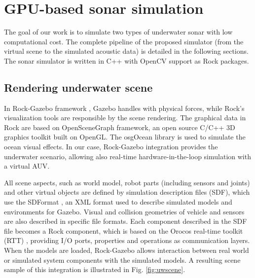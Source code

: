 \documentclass[final,5p,times]{elsarticle}
\begin{document}

\section{GPU-based sonar simulation}
\label{dev}

The goal of our work is to simulate two types of underwater sonar with low computational cost. The complete pipeline of the proposed simulator (from the virtual scene to the simulated acoustic data) is detailed in the following sections. The sonar simulator is written in C++ with OpenCV \cite{bradski2000} support as Rock packages.


\subsection{Rendering underwater scene}
\label{dev:uwscene}

In Rock-Gazebo framework \cite{watanabe2015}, Gazebo handles with physical forces, while Rock's visualization tools are responsible by the scene rendering. The graphical data in Rock are based on OpenSceneGraph framework, an open source C/C++ 3D graphics toolkit built on OpenGL. The osgOcean library is used to simulate the ocean visual effects. In our case, Rock-Gazebo integration provides the underwater scenario, allowing also real-time hardware-in-the-loop simulation with a virtual AUV.

All scene aspects, such as world model, robot parts (including sensors and
joints) and other virtual objects are defined by simulation description files (SDF), which use the SDFormat \cite{sdformat2017}, an XML format used to describe simulated models and environments for Gazebo. Visual and collision geometries of vehicle and sensors are also described in specific file formats. Each component described in the SDF file becomes a Rock component, which is based on the Orocos real-time toolkit (RTT) \cite{soetens2005}, providing I/O ports, properties and operations as communication layers. When the models are loaded, Rock-Gazebo allows interaction between real world or simulated system components with the simulated models. A resulting scene sample of this integration is illustrated in Fig. \ref{fig:uwscene}.

\end{document}
